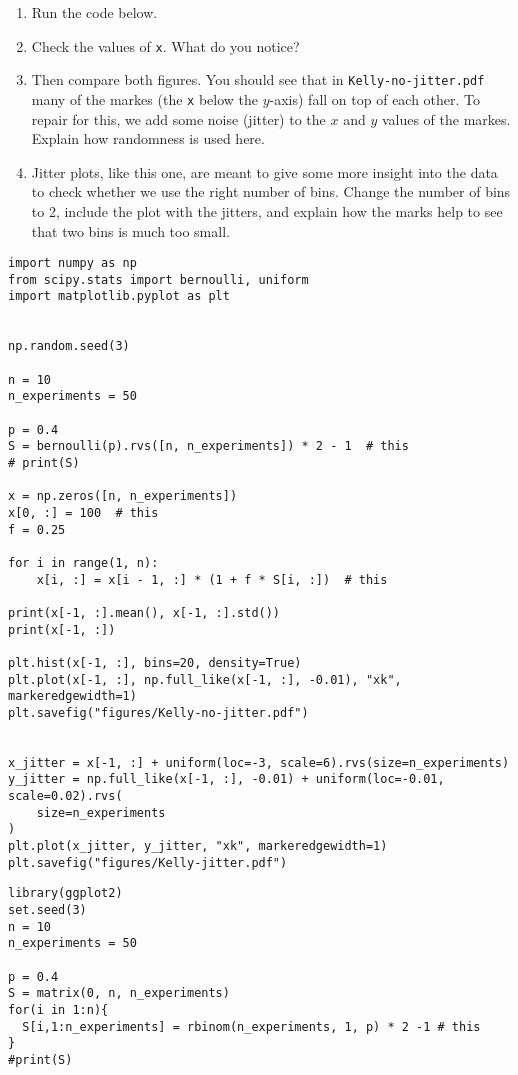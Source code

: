 \begin{exercise}
\begin{enumerate}
\item Run the code below.
\item Check the values of \texttt{x}. What do you notice?
\item Then compare both figures. You should see that in \texttt{Kelly-no-jitter.pdf} many of the markes (the \texttt{x} below the $y$-axis)
fall on top of each other.  To repair for this, we add some noise (jitter) to the $x$ and $y$ values of the markes. Explain how randomness is used here.
\item  Jitter plots, like this one, are meant to give some more insight into the data to check whether we use the right number of bins. Change the number of bins to 2, include the plot with the jitters, and explain how the marks help to see that two bins is much too small.
\end{enumerate}


\begin{verbatim}
import numpy as np
from scipy.stats import bernoulli, uniform
import matplotlib.pyplot as plt


np.random.seed(3)

n = 10
n_experiments = 50

p = 0.4
S = bernoulli(p).rvs([n, n_experiments]) * 2 - 1  # this
# print(S)

x = np.zeros([n, n_experiments])
x[0, :] = 100  # this
f = 0.25

for i in range(1, n):
    x[i, :] = x[i - 1, :] * (1 + f * S[i, :])  # this

print(x[-1, :].mean(), x[-1, :].std())
print(x[-1, :])

plt.hist(x[-1, :], bins=20, density=True)
plt.plot(x[-1, :], np.full_like(x[-1, :], -0.01), "xk", markeredgewidth=1)
plt.savefig("figures/Kelly-no-jitter.pdf")


x_jitter = x[-1, :] + uniform(loc=-3, scale=6).rvs(size=n_experiments)
y_jitter = np.full_like(x[-1, :], -0.01) + uniform(loc=-0.01, scale=0.02).rvs(
    size=n_experiments
)
plt.plot(x_jitter, y_jitter, "xk", markeredgewidth=1)
plt.savefig("figures/Kelly-jitter.pdf")

\end{verbatim}

\begin{verbatim}
library(ggplot2)
set.seed(3)
n = 10
n_experiments = 50

p = 0.4
S = matrix(0, n, n_experiments)
for(i in 1:n){
  S[i,1:n_experiments] = rbinom(n_experiments, 1, p) * 2 -1 # this
}
#print(S)


\end{verbatim}
\end{exercise}
